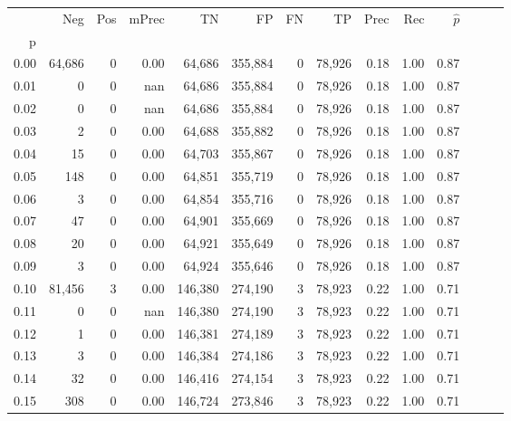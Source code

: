 \begin{tabular}{rrrrrrrrrrrrrr}
\toprule
{} &     Neg &     Pos & mPrec &       TN &       FP &      FN &      TP &  Prec &   Rec & $\hat{p}$ \\
p    &         &         &       &          &          &         &         &       &       &           \\
\midrule
0.00 &  64,686 &       0 &  0.00 &   64,686 &  355,884 &       0 &  78,926 &  0.18 &  1.00 &      0.87 \\
0.01 &       0 &       0 &   nan &   64,686 &  355,884 &       0 &  78,926 &  0.18 &  1.00 &      0.87 \\
0.02 &       0 &       0 &   nan &   64,686 &  355,884 &       0 &  78,926 &  0.18 &  1.00 &      0.87 \\
0.03 &       2 &       0 &  0.00 &   64,688 &  355,882 &       0 &  78,926 &  0.18 &  1.00 &      0.87 \\
0.04 &      15 &       0 &  0.00 &   64,703 &  355,867 &       0 &  78,926 &  0.18 &  1.00 &      0.87 \\
0.05 &     148 &       0 &  0.00 &   64,851 &  355,719 &       0 &  78,926 &  0.18 &  1.00 &      0.87 \\
0.06 &       3 &       0 &  0.00 &   64,854 &  355,716 &       0 &  78,926 &  0.18 &  1.00 &      0.87 \\
0.07 &      47 &       0 &  0.00 &   64,901 &  355,669 &       0 &  78,926 &  0.18 &  1.00 &      0.87 \\
0.08 &      20 &       0 &  0.00 &   64,921 &  355,649 &       0 &  78,926 &  0.18 &  1.00 &      0.87 \\
0.09 &       3 &       0 &  0.00 &   64,924 &  355,646 &       0 &  78,926 &  0.18 &  1.00 &      0.87 \\
0.10 &  81,456 &       3 &  0.00 &  146,380 &  274,190 &       3 &  78,923 &  0.22 &  1.00 &      0.71 \\
0.11 &       0 &       0 &   nan &  146,380 &  274,190 &       3 &  78,923 &  0.22 &  1.00 &      0.71 \\
0.12 &       1 &       0 &  0.00 &  146,381 &  274,189 &       3 &  78,923 &  0.22 &  1.00 &      0.71 \\
0.13 &       3 &       0 &  0.00 &  146,384 &  274,186 &       3 &  78,923 &  0.22 &  1.00 &      0.71 \\
0.14 &      32 &       0 &  0.00 &  146,416 &  274,154 &       3 &  78,923 &  0.22 &  1.00 &      0.71 \\
0.15 &     308 &       0 &  0.00 &  146,724 &  273,846 &       3 &  78,923 &  0.22 &  1.00 &      0.71 \\

\end{tabular}
